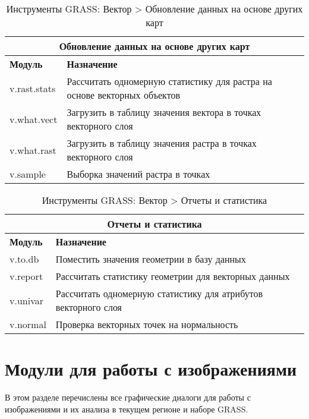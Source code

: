 {\renewcommand{\arraystretch}{0.7}
\begin{table}[H]
\centering
 \begin{tabular}{|p{4cm}|p{10cm}|}
  \hline \multicolumn{2}{|c|}{\textbf{Обновление данных на основе других карт}} \\
  \hline \textbf{Модуль} & \textbf{Назначение} \\
  \hline v.rast.stats & Рассчитать одномерную статистику для растра на
  основе векторных объектов \\
  \hline v.what.vect & Загрузить в таблицу значения вектора в точках
  векторного слоя \\
  \hline v.what.rast & Загрузить в таблицу значения растра в точках
  векторного слоя \\
  \hline v.sample & Выборка значений растра в точках \\
\hline
\end{tabular}
\caption{Инструменты GRASS: Вектор > Обновление данных на основе других карт}
\end{table}}

{\renewcommand{\arraystretch}{0.7}
\begin{table}[H]
\centering
 \begin{tabular}{|p{4cm}|p{10cm}|}
  \hline \multicolumn{2}{|c|}{\textbf{Отчеты и статистика}} \\
  \hline \textbf{Модуль} & \textbf{Назначение} \\
  \hline v.to.db & Поместить значения геометрии в базу данных \\
  \hline v.report & Рассчитать статистику геометрии для векторных данных \\
  \hline v.univar & Рассчитать одномерную статистику для атрибутов
  векторного слоя \\
  \hline v.normal & Проверка векторных точек на нормальность \\
\hline
\end{tabular}
\caption{Инструменты GRASS: Вектор > Отчеты и статистика}
\end{table}}

\section{Модули для работы с изображениями}

В этом разделе перечислены все графические диалоги для работы с
изображениями и их анализа в текущем регионе и наборе GRASS.

